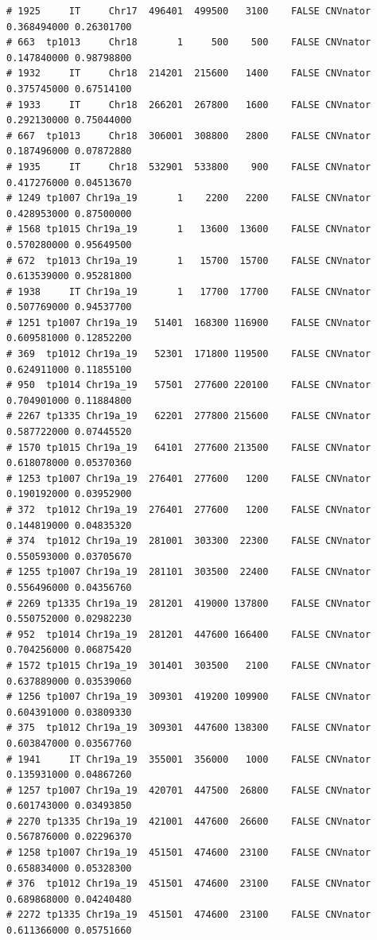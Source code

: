 \documentclass{article}\usepackage[]{graphicx}\usepackage[]{color}
\makeatletter
\newenvironment{kframe}{%
 \def\at@end@of@kframe{}%
 \ifinner\ifhmode%
  \def\at@end@of@kframe{\end{minipage}}%
  \begin{minipage}{\columnwidth}%
 \fi\fi%
 \def\FrameCommand##1{\hskip\@totalleftmargin \hskip-\fboxsep
 \colorbox{shadecolor}{##1}\hskip-\fboxsep
     \hskip-\linewidth \hskip-\@totalleftmargin \hskip\columnwidth}%
 \MakeFramed {\advance\hsize-\width
   \@totalleftmargin\z@ \linewidth\hsize
   \@setminipage}}%
 {\par\unskip\endMakeFramed%
 \at@end@of@kframe}
\newenvironment{knitrout}{}{} %
\makeatother
\begin{document}
\begin{knitrout}
\begin{kframe}
\begin{verbatim}
# 1925     IT     Chr17  496401  499500   3100    FALSE CNVnator 0.368494000 0.26301700
# 663  tp1013     Chr18       1     500    500    FALSE CNVnator 0.147840000 0.98798800
# 1932     IT     Chr18  214201  215600   1400    FALSE CNVnator 0.375745000 0.67514100
# 1933     IT     Chr18  266201  267800   1600    FALSE CNVnator 0.292130000 0.75044000
# 667  tp1013     Chr18  306001  308800   2800    FALSE CNVnator 0.187496000 0.07872880
# 1935     IT     Chr18  532901  533800    900    FALSE CNVnator 0.417276000 0.04513670
# 1249 tp1007 Chr19a_19       1    2200   2200    FALSE CNVnator 0.428953000 0.87500000
# 1568 tp1015 Chr19a_19       1   13600  13600    FALSE CNVnator 0.570280000 0.95649500
# 672  tp1013 Chr19a_19       1   15700  15700    FALSE CNVnator 0.613539000 0.95281800
# 1938     IT Chr19a_19       1   17700  17700    FALSE CNVnator 0.507769000 0.94537700
# 1251 tp1007 Chr19a_19   51401  168300 116900    FALSE CNVnator 0.609581000 0.12852200
# 369  tp1012 Chr19a_19   52301  171800 119500    FALSE CNVnator 0.624911000 0.11855100
# 950  tp1014 Chr19a_19   57501  277600 220100    FALSE CNVnator 0.704901000 0.11884800
# 2267 tp1335 Chr19a_19   62201  277800 215600    FALSE CNVnator 0.587722000 0.07445520
# 1570 tp1015 Chr19a_19   64101  277600 213500    FALSE CNVnator 0.618078000 0.05370360
# 1253 tp1007 Chr19a_19  276401  277600   1200    FALSE CNVnator 0.190192000 0.03952900
# 372  tp1012 Chr19a_19  276401  277600   1200    FALSE CNVnator 0.144819000 0.04835320
# 374  tp1012 Chr19a_19  281001  303300  22300    FALSE CNVnator 0.550593000 0.03705670
# 1255 tp1007 Chr19a_19  281101  303500  22400    FALSE CNVnator 0.556496000 0.04356760
# 2269 tp1335 Chr19a_19  281201  419000 137800    FALSE CNVnator 0.550752000 0.02982230
# 952  tp1014 Chr19a_19  281201  447600 166400    FALSE CNVnator 0.704256000 0.06875420
# 1572 tp1015 Chr19a_19  301401  303500   2100    FALSE CNVnator 0.637889000 0.03539060
# 1256 tp1007 Chr19a_19  309301  419200 109900    FALSE CNVnator 0.604391000 0.03809330
# 375  tp1012 Chr19a_19  309301  447600 138300    FALSE CNVnator 0.603847000 0.03567760
# 1941     IT Chr19a_19  355001  356000   1000    FALSE CNVnator 0.135931000 0.04867260
# 1257 tp1007 Chr19a_19  420701  447500  26800    FALSE CNVnator 0.601743000 0.03493850
# 2270 tp1335 Chr19a_19  421001  447600  26600    FALSE CNVnator 0.567876000 0.02296370
# 1258 tp1007 Chr19a_19  451501  474600  23100    FALSE CNVnator 0.658834000 0.05328300
# 376  tp1012 Chr19a_19  451501  474600  23100    FALSE CNVnator 0.689868000 0.04240480
# 2272 tp1335 Chr19a_19  451501  474600  23100    FALSE CNVnator 0.611366000 0.05751660

\end{verbatim}
\end{kframe}
\end{knitrout}
\end{document}
